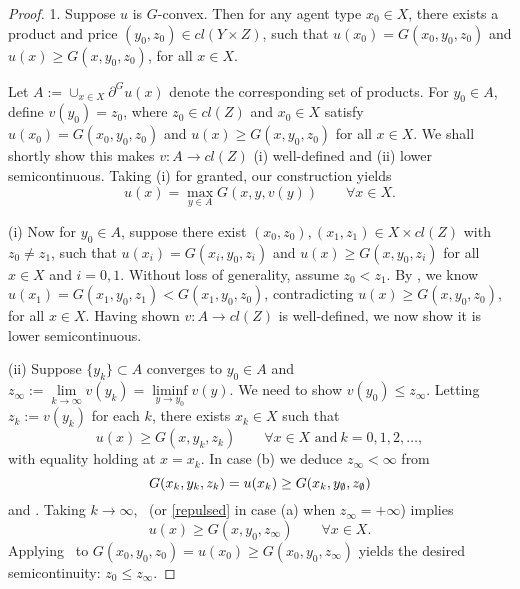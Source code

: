 \begin{proof}
	1. Suppose $u$ is $G$-convex. Then for any agent type $x_0\in X$, there exists a product and price
	$(y_0,z_0) \in cl(Y \times Z)$, such that $u(x_0)=G(x_0,y_0,z_0)$ and $u(x)\ge G(x,y_0,z_0)$, for all $x\in X$. 
							
	Let $A:=\cup_{x\in X} \partial^{G} u(x)$ denote the corresponding set of products.          
	For $y_0\in A$, define $v(y_0) = z_0$, where $z_0\in cl(Z)$ and $x_0\in X$ satisfy $u(x_0)=G(x_0,y_0,z_0)$ and $ u(x)\ge G(x, y_0,z_0)$ for all $x\in X$.
	We shall shortly show this makes $v:A \longrightarrow cl(Z)$ (i) well-defined and (ii) lower semicontinuous. Taking (i)  for granted,  our construction yields
	\begin{equation}\label{restricted1}
	u(x)  =
		\max_{y \in A} G(x,y,v(y)) \qquad \forall x \in X.
	\end{equation}
							
	(i) Now for $y_0 \in A$, suppose there exist $(x_0, z_0), (x_1, z_1)\in X\times cl(Z)$ with 
	$z_0 \ne z_1$, such that $u(x_i) = G(x_i, y_0, z_i)$ and $u(x) \ge G(x, y_0, z_i)$ for all $x\in X$ and $i=0,1$.  Without loss of generality, assume $z_0< z_1$. By \Gfour, we know $u(x_1) = G(x_1, y_0, z_1)<G(x_1, y_0, z_0)$, contradicting $u(x)\ge G(x,y_0,z_0)$, for all $x\in X$.   
	Having shown $v:A \longrightarrow cl(Z)$ is well-defined, we now show it is lower semicontinuous.\medskip
							
							
	(ii) Suppose $\{y_{k}\}\subset A$ converges to $y_0 \in A$ and 
		$z_\infty:= \lim\limits_{k \to \infty} v(y_k) = \liminf\limits_{y \rightarrow y_0}v(y)$.  We need to show 
		$v(y_0) \le z_\infty$.  Letting $z_k := v(y_k)$ for each $k$,  there exists $x_k \in X$ such that 
		\begin{equation}\label{sequence3.6}
			u(x) \ge G( x, y_k,z_k) \qquad {\forall} x \in X \text{ and}\ k =0,1,2,\ldots,
		\end{equation}
	with equality holding at $x=x_k$.  In case (b) we deduce $z_\infty < \infty$ from 
		\begin{equation*}
			G(x_k,y_k,z_k) =u(x_k)  \ge G(x_k,y_{\emptyset},z_{\emptyset})	
		\end{equation*}
	and \Gfive.
	Taking $k \to \infty$,  \Gzero\ (or \eqref{repulsed}  in case (a) when $z_\infty=+\infty$)
	implies
	\begin{equation}\label{limit3.6}
		u(x) \ge G(x,y_0,z_\infty) \qquad {\forall} x \in X.
	\end{equation}
	Applying \Gfour\ to $G(x_0,y_0,z_0)=u(x_0)\ge G(x_0,y_0,z_\infty)$ yields 
	the desired semicontinuity: $z_0 \le z_\infty$.\medskip
							

\end{proof}
